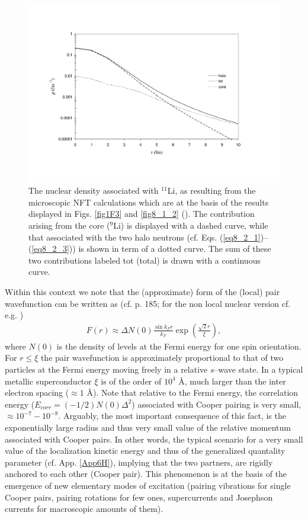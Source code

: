 \begin{figure}
\centerline{\includegraphics*[width=15cm,angle=0]{nutshell/figs/fig3_2_2.pdf}}
\caption{The nuclear density associated with $^{11}$Li, as resulting from the microscopic NFT calculations which are at the basis of the results displayed in Figs. \ref{fig1F3} and \ref{fig8_1_2} (\cite{Barranco:01}). The contribution arising from the core ($^{9}$Li) is displayed with a dashed curve, while that associated with the two halo neutrons (cf. Eqs. (\ref{eq8_2_1})--(\ref{eq8_2_3})) is shown in term of a dotted curve. The sum of these two contributions  labeled tot (total) is drawn with a continuous curve.}\label{fig3.2.2}
\end{figure}
Within this context we note that the (approximate) form of the (local) pair wavefunction can be written as (cf. \cite{Leggett:06} p. 185; for the non local nuclear version cf. e.g. \cite{Broglia:83c})
\begin{align}
F(r)\approx\Delta N(0)\frac{\sin k_F r}{k_F}\exp\left(\frac{\sqrt{2}r}{\xi}\right),
\end{align}
where $N(0)$ is the density of levels at the Fermi energy for one spin orientation. For $r\leq\xi$ the pair wavefunction is approximately proportional to that of two particles at the Fermi energy moving freely in a relative $s$--wave state. In a typical metallic superconductor $\xi$ is of the order of $10^4$ \AA, much larger than the inter electron spacing ($\approx 1$ \AA). Note that relative to the Fermi energy, the correlation energy ($E_{corr}=(-1/2)N(0)\Delta^2$) associated with Cooper pairing is very small, $\approx 10^{-7}-10^{-8}$. Arguably, the most important consequence of this fact, is the exponentially large radius and thus very small value of the relative momentum associated with Cooper pairs. In other words, the typical scenario for a very small value of the localization kinetic energy and thus of the generalized quantality parameter (cf. App. \ref{App6H}), implying that the two partners, are rigidly anchored to each other (Cooper pair). This phenomenon is at the basis  of the emergence of new elementary modes of excitation (pairing vibrations for single Cooper pairs, pairing rotations for few ones, supercurrents and Josephson currents for macroscopic amounts of them).



